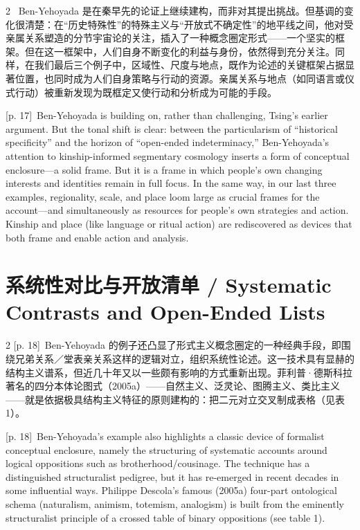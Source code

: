 \documentclass[10pt,a4paper]{article}
\begin{document}
\begin{paracol}{2}
\switchcolumn*
{\scriptsize\color{gray} [p. 17]}\ Ben-Yehoyada 是在秦早先的论证上继续建构，而非对其提出挑战。但基调的变化很清楚：在“历史特殊性”的特殊主义与“开放式不确定性”的地平线之间，他对受亲属关系塑造的分节宇宙论的关注，插入了一种概念圈定形式——一个坚实的框架。但在这一框架中，人们自身不断变化的利益与身份，依然得到充分关注。同样，在我们最后三个例子中，区域性、尺度与地点，既作为论述的关键框架占据显著位置，也同时成为人们自身策略与行动的资源。亲属关系与地点（如同语言或仪式行动）被重新发现为既框定又使行动和分析成为可能的手段。\par
\switchcolumn
{\scriptsize\color{gray} [p. 17]}\ Ben-Yehoyada is building on, rather than challenging, Tsing’s earlier argument. But the tonal shift is clear: between the particularism of “historical specificity” and the horizon of “open-ended indeterminacy,” Ben-Yehoyada’s attention to kinship-informed segmentary cosmology inserts a form of conceptual enclosure—a solid frame. But it is a frame in which people’s own changing interests and identities remain in full focus. In the same way, in our last three examples, regionality, scale, and place loom large as crucial frames for the account—and simultaneously as resources for people’s own strategies and action. Kinship and place (like language or ritual action) are rediscovered as devices that both frame and enable action and analysis.\par
\switchcolumn*
\end{paracol}
\section*{系统性对比与开放清单 / Systematic Contrasts and Open-Ended Lists}
\begin{paracol}{2}
{\scriptsize\color{gray} [p. 18]}\ Ben-Yehoyada 的例子还凸显了形式主义概念圈定的一种经典手段，即围绕兄弟关系／堂表亲关系这样的逻辑对立，组织系统性论述。这一技术具有显赫的结构主义谱系，但近几十年又以一些颇有影响的方式重新出现。菲利普·德斯科拉著名的四分本体论图式（2005a）——自然主义、泛灵论、图腾主义、类比主义——就是依据极具结构主义特征的原则建构的：把二元对立交叉制成表格（见表1）。\par
\switchcolumn
{\scriptsize\color{gray} [p. 18]}\ Ben-Yehoyada’s example also highlights a classic device of formalist conceptual enclosure, namely the structuring of systematic accounts around logical oppositions such as brotherhood/cousinage. The technique has a distinguished structuralist pedigree, but it has re-emerged in recent decades in some influential ways. Philippe Descola’s famous (2005a) four-part ontological schema (naturalism, animism, totemism, analogism) is built from the eminently structuralist principle of a crossed table of binary oppositions (see table 1).\par
\switchcolumn*
\end{paracol}
\end{document}
